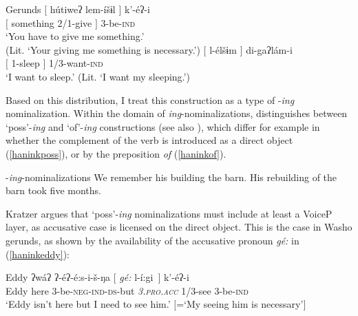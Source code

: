 \documentclass[output=paper]{langscibook}
\begin{document}
 \ea Gerunds \label{haninkgerunds}
 \ea \gll $[$ hútiweʔ lem-íšɨl $]$ k'-éʔ-i\\
$[$ something  2/1-give $]$ 3-be-{\scshape ind}\\
\glt `You have to give me something.' \\ (Lit. `{Your giving me something is necessary}.') \label{haninkgive}
 \ex \gll $[$ l-élšɨm $]$ di-gaʔlám-i\\
$[$ 1-sleep $]$ 1/3-want-{\scshape ind}\\
\glt `I want to sleep.' (Lit. `{I want my sleeping}.')\label{haninksleep}
 \z
 \z 
 
Based on this distribution, I treat this construction as a type of -{\itshape ing} nominalization. Within the domain of {\itshape ing}-nominalizations, \citet{kratzer1996} distinguishes between  `poss'-{\itshape ing} and `of'-{\itshape ing} constructions (see also \citealt{abney1987,alexiadou2005,harley2009}), which differ for example in whether the complement of the verb is introduced as a direct object (\ref{haninkposs}), or by the preposition {\itshape of} (\ref{haninkof}).
 

 \ea -\textit{ing}-nominalizations
 \ea  We remember his building the barn. \label{haninkposs} 
 \ex His rebuilding of the barn took five months. \label{haninkof} \hfill \citep[126--127]{kratzer1996}
 \z
 \z
 
Kratzer argues that `poss'-{\itshape ing} nominalizations must include at least a VoiceP layer, as accusative case is licensed on the direct object. This is the case in Washo gerunds, as shown by the availability of the accusative pronoun {\itshape gé:} in (\ref{haninkeddy}):
 
 
 \ea \gll Eddy ʔwáʔ ʔ-éʔ-é:s-i-š-ŋa $[$ {\itshape gé:} l-í:gi\ $]$ k'-éʔ-i\\
Eddy here 3-be-{\scshape neg-ind-ds}-but {} \textit{\textsc{3.pro.acc}} 1/3-see 3-be-{\scshape ind}\\
\glt `Eddy isn't here but I need to see him.' $[$=`My seeing him is necessary'$]$\label{haninkeddy}
\z 

\end{document}
